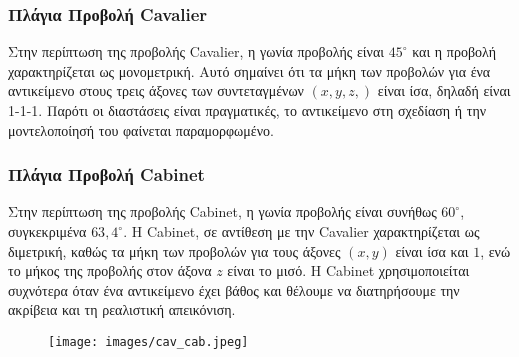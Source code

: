 \vspace{3em}

\subsubsection{Πλάγια Προβολή Cavalier}

Στην περίπτωση της προβολής Cavalier, η γωνία προβολής είναι $45^\circ$ και η προβολή χαρακτηρίζεται ως μονομετρική. Αυτό σημαίνει ότι τα μήκη των προβολών για ένα αντικείμενο στους τρεις άξονες των συντεταγμένων $(x,y,z,)$ είναι ίσα, δηλαδή είναι 1-1-1. Παρότι οι διαστάσεις είναι πραγματικές, το αντικείμενο στη σχεδίαση ή την μοντελοποίησή του φαίνεται παραμορφωμένο. 


\subsubsection{Πλάγια Προβολή Cabinet}

Στην περίπτωση της προβολής Cabinet, η γωνία προβολής είναι συνήθως $60^\circ$, συγκεκριμένα $63,4^\circ$. Η Cabinet, σε αντίθεση με την Cavalier χαρακτηρίζεται ως διμετρική, καθώς τα μήκη των προβολών για τους άξονες $(x,y)$ είναι ίσα και $1$, ενώ το μήκος της προβολής στον άξονα $z$ είναι το μισό. Η Cabinet χρησιμοποιείται συχνότερα όταν ένα αντικείμενο έχει βάθος και θέλουμε να διατηρήσουμε την ακρίβεια και τη ρεαλιστική απεικόνιση. 

\begin{figure}[H]
\centering
\texttt{[image: images/cav\_cab.jpeg]}
\end{figure}

